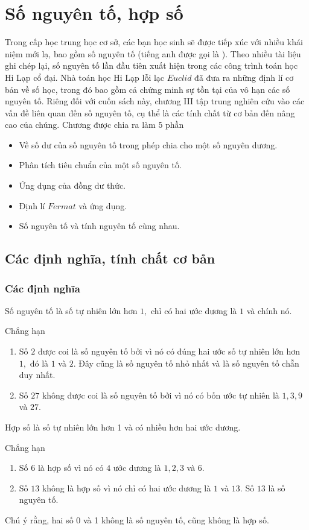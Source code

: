 \chapter{Số nguyên tố, hợp số}

Trong cấp học trung học cơ sở, các bạn học sinh sẽ được tiếp xúc với nhiều khái niệm mới lạ, bao gồm số nguyên tố (tiếng anh được gọi là ). Theo nhiều tài liệu ghi chép lại, số nguyên tố lần đầu tiên xuất hiện trong các công trình toán học Hi Lạp cổ đại. Nhà toán học Hi Lạp lỗi lạc $Euclid$ đã đưa ra những định lí cơ bản về số học, trong đó bao gồm cả chứng minh sự tồn tại của vô hạn các số nguyên tố. Riêng đối với cuốn sách này, chương III tập trung nghiên cứu vào các vấn đề liên quan đến số nguyên tố, cụ thể là các tính chất từ cơ bản đến nâng cao của chúng. Chương được chia ra làm $5$ phần
\begin{itemize}
    \item{} Về số dư của số nguyên tố trong phép chia cho một số nguyên dương.
    \item{} Phân tích tiêu chuẩn của một số nguyên tố.
    \item{} Ứng dụng của đồng dư thức.
    \item{} Định lí $Fermat$ và ứng dụng.
    \item{} Số nguyên tố và tính nguyên tố cùng nhau.
\end{itemize}


\section{Các định nghĩa, tính chất cơ bản}
\subsection{Các định nghĩa}
\begin{light}
 Số nguyên tố là số tự nhiên lớn hơn $1,$ chỉ có hai ước dương là $1$ và chính nó.
\end{light} 

Chẳng hạn
\begin{enumerate}
    \item Số $2$ được coi là số nguyên tố bởi vì nó có đúng hai ước số tự nhiên lớn hơn $1,$ đó là $1$ và $2.$ Đây cũng là số nguyên tố nhỏ nhất và là số nguyên tố chẵn duy nhất.
    \item Số $27$ không được coi là số nguyên tố bởi vì nó có bốn ước tự nhiên là $1,3,9$ và $27.$  
\end{enumerate}
\begin{light}
 Hợp số là số tự nhiên lớn hơn 1 và có nhiều hơn hai ước dương.
\end{light}
Chẳng hạn
\begin{enumerate}
    \item Số $6$ là hợp số vì nó có $4$ ước dương là $1,2,3$ và $6$.
    \item Số $13$ không là hợp số vì nó chỉ có hai ước dương là $1$ và $13$. Số $13$ là số nguyên tố.
\end{enumerate}
Chú ý rằng, hai số 0 và 1 không là số nguyên tố, cũng không là hợp số.
